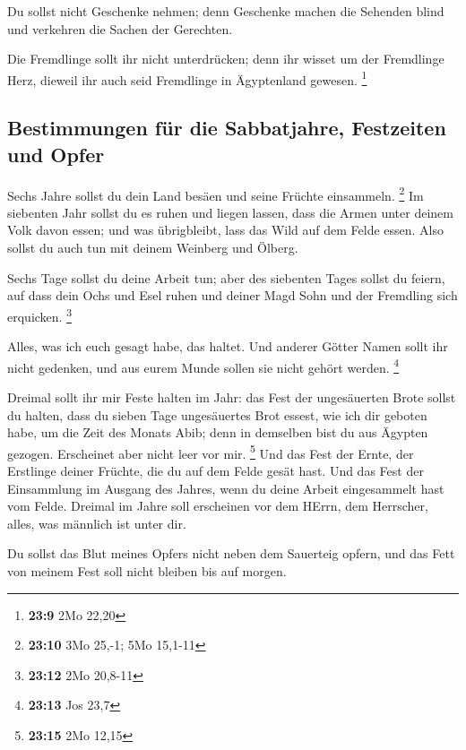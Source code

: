  Du sollst nicht Geschenke nehmen; denn Geschenke machen
die Sehenden blind und verkehren die Sachen der Gerechten.

 Die Fremdlinge sollt ihr nicht unterdrücken; denn ihr
wisset um der Fremdlinge Herz, dieweil ihr auch seid Fremdlinge in
Ägyptenland gewesen. \footnote{\textbf{23:9} 2Mo 22,20}

\hypertarget{bestimmungen-fuxfcr-die-sabbatjahre-festzeiten-und-opfer}{%
\subsection{Bestimmungen für die Sabbatjahre, Festzeiten und
Opfer}\label{bestimmungen-fuxfcr-die-sabbatjahre-festzeiten-und-opfer}}

 Sechs Jahre sollst du dein Land besäen und seine Früchte
einsammeln. \footnote{\textbf{23:10} 3Mo 25,-1; 5Mo 15,1-11}
 Im siebenten Jahr sollst du es ruhen und liegen lassen,
dass die Armen unter deinem Volk davon essen; und was übrigbleibt, lass
das Wild auf dem Felde essen. Also sollst du auch tun mit deinem
Weinberg und Ölberg.

 Sechs Tage sollst du deine Arbeit tun; aber des
siebenten Tages sollst du feiern, auf dass dein Ochs und Esel ruhen und
deiner Magd Sohn und der Fremdling sich erquicken. \footnote{\textbf{23:12}
  2Mo 20,8-11}

 Alles, was ich euch gesagt habe, das haltet. Und anderer
Götter Namen sollt ihr nicht gedenken, und aus eurem Munde sollen sie
nicht gehört werden. \footnote{\textbf{23:13} Jos 23,7}

 Dreimal sollt ihr mir Feste halten im Jahr:
 das Fest der ungesäuerten Brote sollst du halten, dass
du sieben Tage ungesäuertes Brot essest, wie ich dir geboten habe, um
die Zeit des Monats Abib; denn in demselben bist du aus Ägypten gezogen.
Erscheinet aber nicht leer vor mir. \footnote{\textbf{23:15} 2Mo 12,15}
 Und das Fest der Ernte, der Erstlinge deiner Früchte,
die du auf dem Felde gesät hast. Und das Fest der Einsammlung im Ausgang
des Jahres, wenn du deine Arbeit eingesammelt hast vom Felde.
 Dreimal im Jahre soll erscheinen vor dem HErrn, dem
Herrscher, alles, was männlich ist unter dir.

 Du sollst das Blut meines Opfers nicht neben dem
Sauerteig opfern, und das Fett von meinem Fest soll nicht bleiben bis
auf morgen.

